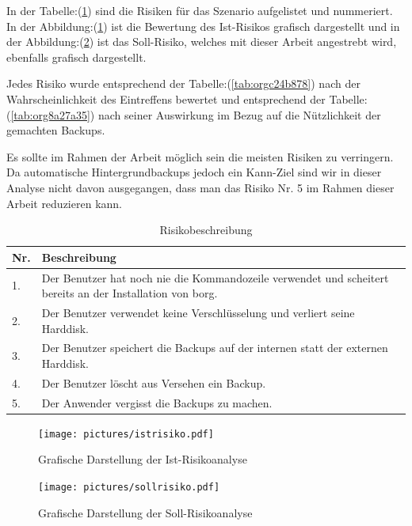In der Tabelle:(\ref{tab:orgb156d31}) sind die Risiken für das Szenario
aufgelistet und nummeriert. In der Abbildung:(\ref{fig:org2c84d03}) ist die
Bewertung des Ist-Risikos grafisch dargestellt und in der
Abbildung:(\ref{fig:org525577a}) ist das Soll-Risiko, welches mit dieser Arbeit
angestrebt wird, ebenfalls grafisch dargestellt.

Jedes Risiko wurde entsprechend der Tabelle:(\ref{tab:orgc24b878}) nach der
Wahrscheinlichkeit des Eintreffens bewertet und entsprechend der
Tabelle:(\ref{tab:org8a27a35}) nach seiner Auswirkung im Bezug auf die
Nützlichkeit der gemachten Backups.

Es sollte im Rahmen der Arbeit möglich sein die meisten Risiken zu verringern.
Da automatische Hintergrundbackups jedoch ein Kann-Ziel sind wir in dieser
Analyse nicht davon ausgegangen, dass man das Risiko Nr. 5 im Rahmen dieser
Arbeit reduzieren kann.
\begin{table}[H]
\centering
\begin{tabular}{|>{\columncolor[HTML]{EFEFEF}}p{}|p{}|}
\hline
\textbf{Nr.}\cellcolor[HTML]{C0C0C0} & \textbf{Beschreibung}\cellcolor[HTML]{C0C0C0}\\
\hline
1. & Der Benutzer hat noch nie die Kommandozeile verwendet und scheitert bereits an der Installation von \gls{borg}.\\
\hline
2. & Der Benutzer verwendet keine Verschlüsselung und verliert seine Harddisk.\\
\hline
3. & Der Benutzer speichert die Backups auf der internen statt der externen Harddisk.\\
\hline
4. & Der Benutzer löscht aus Versehen ein Backup.\\
\hline
5. & Der Anwender vergisst die Backups zu machen.\\
\hline
\end{tabular}
\caption{\label{tab:orgb156d31}
Risikobeschreibung}

\end{table}

\begin{figure}
\centering
\texttt{[image: pictures/istrisiko.pdf]}
\caption{\label{fig:org2c84d03}
Grafische Darstellung der Ist-Risikoanalyse}
\end{figure}

\begin{figure}
\centering
\texttt{[image: pictures/sollrisiko.pdf]}
\caption{\label{fig:org525577a}
Grafische Darstellung der Soll-Risikoanalyse}
\end{figure}


